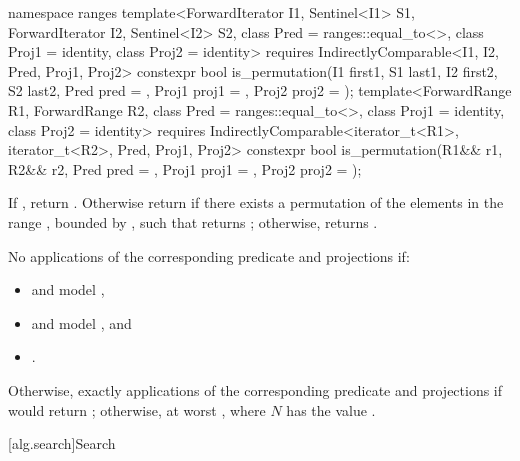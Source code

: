 %
\begin{itemdecl}
namespace ranges {
  template<ForwardIterator I1, Sentinel<I1> S1, ForwardIterator I2,
      Sentinel<I2> S2, class Pred = ranges::equal_to<>, class Proj1 = identity,
      class Proj2 = identity>
    requires IndirectlyComparable<I1, I2, Pred, Proj1, Proj2>
    constexpr bool is_permutation(I1 first1, S1 last1, I2 first2, S2 last2,
                                  Pred pred = {},
                                  Proj1 proj1 = {}, Proj2 proj2 = {});
  template<ForwardRange R1, ForwardRange R2, class Pred = ranges::equal_to<>,
      class Proj1 = identity, class Proj2 = identity>
    requires IndirectlyComparable<iterator_t<R1>, iterator_t<R2>, Pred, Proj1, Proj2>
    constexpr bool is_permutation(R1&& r1, R2&& r2, Pred pred = {},
                                  Proj1 proj1 = {}, Proj2 proj2 = {});
}
\end{itemdecl}

\begin{itemdescr}
\pnum
\returns If , return .
Otherwise return  if there exists a permutation of the elements in the
range , bounded by , such that
 returns ;
otherwise, returns .

\pnum
\complexity
No applications of the corresponding predicate and projections if:
\begin{itemize}
\item {} and  model ,
\item {} and  model , and
\item {}.
\end{itemize}
Otherwise, exactly  applications of the
corresponding predicate and projections if
would return ; otherwise, at
worst , where $N$ has the value .
\end{itemdescr}

[alg.search]{Search}

